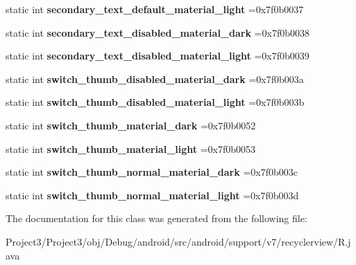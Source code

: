 \begin{DoxyCompactItemize}
static int {\bfseries secondary\+\_\+text\+\_\+default\+\_\+material\+\_\+light} =0x7f0b0037
\item 
\mbox{\label{classandroid_1_1support_1_1v7_1_1recyclerview_1_1R_1_1color_a3d072a7c2d4989d6ebccbea75c7a1740}} 
static int {\bfseries secondary\+\_\+text\+\_\+disabled\+\_\+material\+\_\+dark} =0x7f0b0038
\item 
\mbox{\label{classandroid_1_1support_1_1v7_1_1recyclerview_1_1R_1_1color_aef926ee79f903bef63949e0a74cb762c}} 
static int {\bfseries secondary\+\_\+text\+\_\+disabled\+\_\+material\+\_\+light} =0x7f0b0039
\item 
\mbox{\label{classandroid_1_1support_1_1v7_1_1recyclerview_1_1R_1_1color_ab479935e6f81c9609b2c78e6be2433c3}} 
static int {\bfseries switch\+\_\+thumb\+\_\+disabled\+\_\+material\+\_\+dark} =0x7f0b003a
\item 
\mbox{\label{classandroid_1_1support_1_1v7_1_1recyclerview_1_1R_1_1color_aa576e50b58b05d0d7795a03608e3193f}} 
static int {\bfseries switch\+\_\+thumb\+\_\+disabled\+\_\+material\+\_\+light} =0x7f0b003b
\item 
\mbox{\label{classandroid_1_1support_1_1v7_1_1recyclerview_1_1R_1_1color_ae82069915dfa89917c4d9a48db75b77c}} 
static int {\bfseries switch\+\_\+thumb\+\_\+material\+\_\+dark} =0x7f0b0052
\item 
\mbox{\label{classandroid_1_1support_1_1v7_1_1recyclerview_1_1R_1_1color_ab19bc6eecc7960d94b76b30f553b82c3}} 
static int {\bfseries switch\+\_\+thumb\+\_\+material\+\_\+light} =0x7f0b0053
\item 
\mbox{\label{classandroid_1_1support_1_1v7_1_1recyclerview_1_1R_1_1color_ae0be2e47711927a99abcc3bdab19d980}} 
static int {\bfseries switch\+\_\+thumb\+\_\+normal\+\_\+material\+\_\+dark} =0x7f0b003c
\item 
\mbox{\label{classandroid_1_1support_1_1v7_1_1recyclerview_1_1R_1_1color_aa10671c7b32f0c9922507cc1741f02e3}} 
static int {\bfseries switch\+\_\+thumb\+\_\+normal\+\_\+material\+\_\+light} =0x7f0b003d
\end{DoxyCompactItemize}


The documentation for this class was generated from the following file\+:\begin{DoxyCompactItemize}
\item 
Project3/\+Project3/obj/\+Debug/android/src/android/support/v7/recyclerview/R.\+java\end{DoxyCompactItemize}
